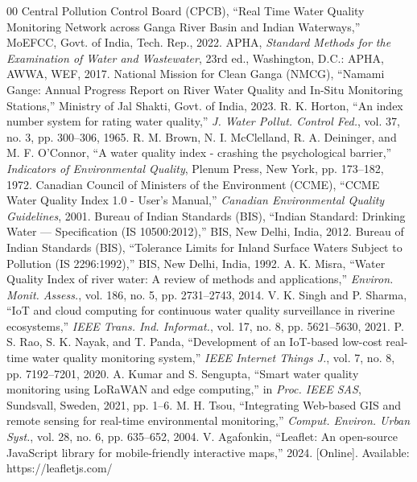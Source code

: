 \documentclass[conference]{IEEEtran}
\begin{document}
\begin{thebibliography}{00}
 Central Pollution Control Board (CPCB), ``Real Time Water Quality Monitoring Network across Ganga River Basin and Indian Waterways,'' MoEFCC, Govt. of India, Tech. Rep., 2022.
 APHA, \textit{Standard Methods for the Examination of Water and Wastewater}, 23rd ed., Washington, D.C.: APHA, AWWA, WEF, 2017.
 National Mission for Clean Ganga (NMCG), ``Namami Gange: Annual Progress Report on River Water Quality and In-Situ Monitoring Stations,'' Ministry of Jal Shakti, Govt. of India, 2023.
 R. K. Horton, ``An index number system for rating water quality,'' \textit{J. Water Pollut. Control Fed.}, vol. 37, no. 3, pp. 300--306, 1965.
 R. M. Brown, N. I. McClelland, R. A. Deininger, and M. F. O'Connor, ``A water quality index - crashing the psychological barrier,'' \textit{Indicators of Environmental Quality}, Plenum Press, New York, pp. 173--182, 1972.
 Canadian Council of Ministers of the Environment (CCME), ``CCME Water Quality Index 1.0 - User's Manual,'' \textit{Canadian Environmental Quality Guidelines}, 2001.
 Bureau of Indian Standards (BIS), ``Indian Standard: Drinking Water — Specification (IS 10500:2012),'' BIS, New Delhi, India, 2012.
 Bureau of Indian Standards (BIS), ``Tolerance Limits for Inland Surface Waters Subject to Pollution (IS 2296:1992),'' BIS, New Delhi, India, 1992.
 A. K. Misra, ``Water Quality Index of river water: A review of methods and applications,'' \textit{Environ. Monit. Assess.}, vol. 186, no. 5, pp. 2731--2743, 2014.
 V. K. Singh and P. Sharma, ``IoT and cloud computing for continuous water quality surveillance in riverine ecosystems,'' \textit{IEEE Trans. Ind. Informat.}, vol. 17, no. 8, pp. 5621--5630, 2021.
 P. S. Rao, S. K. Nayak, and T. Panda, ``Development of an IoT-based low-cost real-time water quality monitoring system,'' \textit{IEEE Internet Things J.}, vol. 7, no. 8, pp. 7192--7201, 2020.
 A. Kumar and S. Sengupta, ``Smart water quality monitoring using LoRaWAN and edge computing,'' in \textit{Proc. IEEE SAS}, Sundsvall, Sweden, 2021, pp. 1--6.
 M. H. Tsou, ``Integrating Web-based GIS and remote sensing for real-time environmental monitoring,'' \textit{Comput. Environ. Urban Syst.}, vol. 28, no. 6, pp. 635--652, 2004.
 V. Agafonkin, ``Leaflet: An open-source JavaScript library for mobile-friendly interactive maps,'' 2024. [Online]. Available: https://leafletjs.com/

\end{thebibliography}
\end{document}

